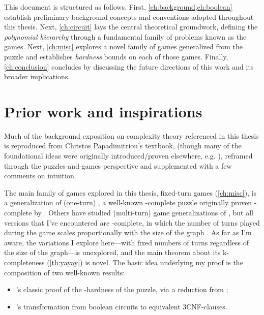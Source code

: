 This document is structured as follows.  First, \cref{ch:background,ch:boolean}
establish preliminary background concepts and conventions adopted throughout
this thesis.  Next, \cref{ch:circuit} lays the central theoretical groundwork,
defining the \emph{polynomial hierarchy} through a fundamental family of
problems known as the  games.  Next,
\cref{ch:misc} explores a novel family of games generalized from the
 puzzle and establishes \emph{hardness} bounds on
each of those games.  Finally, \cref{ch:conclusion} concludes by discussing the
future directions of this work and its broader implications.

\section{Prior work and inspirations}

Much of the background exposition on complexity theory referenced in this thesis
is reproduced from Christos Papadimitriou's textbook,
\textcite{papadimitriou.cc} (though many of the foundational ideas were
originally introduced/proven elsewhere, e.g.
\textcite{cook.np,levin.np,stockmeyer.ph}), reframed through the
puzzles-and-games perspective and supplemented with a few comments on intuition.

The main family of games explored in this thesis, fixed-turn
 games (\cref{ch:misc}), is a generalization of
(one-turn) , a well-known \NP-complete puzzle originally
proven \NP-complete by \textcite{karp.np}.  Others have studied (multi-turn)
game generalizations of , but all versions that I've
encountered are \PSPACE-complete, in which the number of turns played during the
game scales proportionally with the size of the graph
\parencite{bodlaender.coloring,bh.placement,kbd.impartial,cpss.coloring,schaefer.games}. As far as I'm aware, the variations I explore here—with fixed
numbers of turns regardless of the size of the graph—is unexplored, and the main
theorem about its \SigmaP k-completeness (\cref{th:yayay}) is novel.  The basic
idea underlying my proof is the composition of two well-known results:
\begin{itemize}[nosep]
  \item \textcite{karp.np}'s classic proof of the \NP-hardness of the  puzzle, via a reduction from ;
  \item \textcite{tseitin}'s transformation from boolean circuits to equivalent 3CNF-clauses.
\end{itemize}

